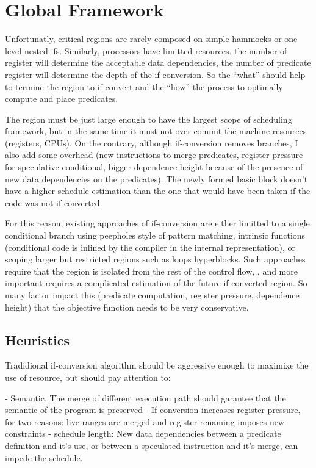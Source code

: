 \section{Global Framework}

Unfortunatly, critical regions are rarely composed on simple hammocks or one level nested ifs. Similarly, processors have limitted resources. the number of register will determine the acceptable data dependencies, the number of predicate register will determine the depth of the if-conversion. So the ``what'' should help to termine the region to if-convert and the ``how'' the process to optimally compute and place predicates.

The region must be just large enough to have the largest scope of scheduling framework, but in the same time it must not over-commit the machine resources (registers, CPUs). On the contrary, although if-conversion removes branches, I also add some overhead (new instructions to merge predicates, register pressure for speculative conditional, bigger dependence height because of the presence of new data dependencies on the predicates). The newly formed basic block doesn't have a higher schedule estimation than the one that would have been taken if the code was not if-converted.

For this reason, existing approaches of if-conversion are either limitted to a single conditional branch using peepholes style of pattern matching, intrinsic functions (conditional code is inlined by the compiler in the internal representation), or scoping larger but restricted regions such as loops hyperblocks. Such approaches require that the region is isolated from the rest of the control flow, , and more important requires a complicated estimation of the future if-converted region. So many factor impact this (predicate computation, register pressure, dependence height) that the objective function needs to be very conservative.

\subsection{Heuristics}

Tradidional if-conversion algorithm should be aggressive enough to maximixe the use of resource, but should pay attention to:

- Semantic. The merge of different execution path should garantee that the semantic of the program is preserved
- If-conversion increases register pressure, for two reasons: live ranges are merged and register renaming imposes new constraints
- schedule length: New data dependencies between a predicate definition and it's use, or between a speculated instruction and it's merge, can impede the schedule.

